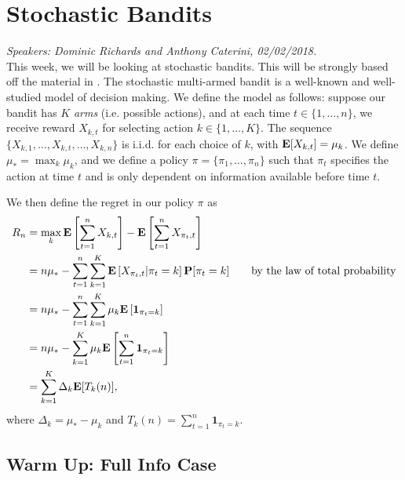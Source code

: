 \section{Stochastic Bandits}
\emph{Speakers: Dominic Richards and Anthony Caterini, 02/02/2018.}\\

This week, we will be looking at stochastic bandits. This will be strongly based off the material in \cite[Lecture~18]{rigollet}. The stochastic multi-armed bandit is a well-known and well-studied model of decision making. We define the model as follows: suppose our bandit has $K$ \emph{arms} (i.e. possible actions), and at each time $t \in \{1, \ldots, n\}$, we receive reward $X_{k,t}$ for selecting action $k \in \{1, \ldots, K\}$. The sequence $\{X_{k, 1}, \ldots, X_{k, t}, \ldots, X_{k, n}\}$ is i.i.d. for each choice of $k$, with $\mathbf{E}[X_{k,t}] = \mu_k$. We define $\mu_* = \max_k \mu_k$, and we define a policy $\pi = \{\pi_1, \ldots, \pi_n\}$ such that $\pi_t$ specifies the action at time $t$ and is only dependent on information available before time $t$.

We then define the regret in our policy $\pi$ as
\begin{align}
R_n &= \max_k \mathbf{E}\left[\sum_{t = 1}^n X_{k,t} \right] - \mathbf{E}\left[\sum_{t=1}^n X_{\pi_t, t} \right] \nonumber \\
&= n \mu_* - \sum_{t=1}^n \sum_{k=1}^K \mathbf{E}\left[ X_{\pi_t, t} | \pi_t = k\right] \mathbf{P}[\pi_t = k] \qquad \text{by the law of total probability} \nonumber \\
&= n \mu_* - \sum_{t=1}^n \sum_{k=1}^K \mu_k \mathbf{E}\left[ \mathbf{1}_{\pi_t = k}\right] \nonumber \\
&= n \mu_* - \sum_{k=1}^K \mu_k \mathbf{E} \left[\sum_{t=1}^n \mathbf{1}_{\pi_t = k} \right] \nonumber \\
&= \sum_{k=1}^K \Delta_k \mathbf{E}[T_k(n)], \label{eqn:bandit_regret}
\end{align}
where $\Delta_k = \mu_* - \mu_k$ and $T_k(n) = \sum_{t=1}^n \mathbf{1}_{\pi_t = k}$.

\subsection{Warm Up: Full Info Case}

